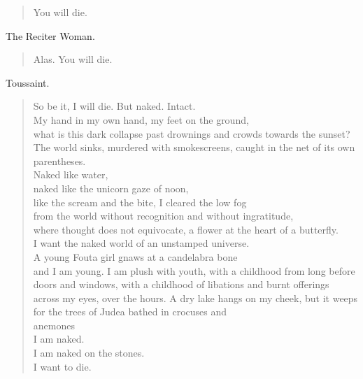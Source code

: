 \documentclass[letterpaper,article,12pt,oneside,notitlepage]{memoir}
\begin{document}
\begin{verse}
\hspace{1cm} You will die. \\
\end{verse}

\begin{center}The Reciter Woman.\end{center}

\begin{verse}
\hspace{1cm} Alas. You will die. \\
\end{verse}

\begin{center}Toussaint.\end{center}

\begin{verse}
\hspace{1cm} So be it, I will die. But naked. Intact. \\
My hand in my own hand, my feet on the ground, \\
what is this dark collapse past drownings and crowds towards the sunset? The world sinks, murdered with smokescreens, caught in the net of its own parentheses. \\
Naked like water, \\
naked like the unicorn gaze of noon, \\
like the scream and the bite, I cleared the low fog \\
from the world without recognition and without ingratitude, \\
where thought does not equivocate, a flower at the heart of a butterfly. \\
I want the naked world of an unstamped universe. \\
A young Fouta girl gnaws at a candelabra bone \\
\indent and I am young. I am plush with youth, with a childhood from long before doors and windows, with a childhood of libations and burnt offerings across my eyes, over the hours. A dry lake hangs on my cheek, but it weeps for the trees of Judea bathed in crocuses and \\
anemones \\
I am naked. \\
I am naked on the stones. \\
I want to die. \\
\end{verse}
\end{document}
